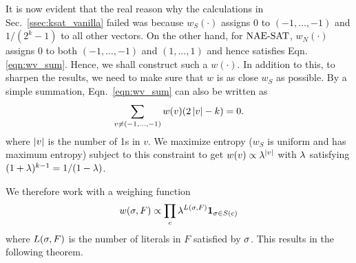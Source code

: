 \documentclass[letterpaper, 10pt, twocolumn, reqno]{amsart}
\begin{document}
It is now evident that the real reason why the calculations in Sec.~\ref{ssec:ksat_vanilla} failed was because $w_S(\cdot)$ assigns 0 to $(-1,\ldots,-1)$
and $1/(2^k-1)$ to all other vectors. On the other hand, for $\textrm{NAE-SAT}$, $w_N(\cdot)$ assigns 0 to both $(-1,\ldots,-1)$ and $(1,\ldots,1)$ and hence satisfies Eqn.~
\eqref{eqn:wv_sum}. Hence, we shall construct such a $w(\cdot)$. In addition to this, to sharpen the results, we need to make sure that $w$ is as close $w_S
$ as possible. By a simple summation, Eqn.~\eqref{eqn:wv_sum} can also be written as
$$
\sum_{v \neq (-1,\ldots,-1)} w(v) (2\left| v \right| - k) = 0.
$$
where $\left| v \right|$ is the number of 1s in $v$. We maximize entropy ($w_S$ is uniform and has maximum entropy) subject to this constraint to get $w(v) \propto \lambda^{\left| v \right|}$ with $\lambda$ satisfying $(1+\lambda)^{k-1} = 1/(1-\lambda)$.

We therefore work with a weighing function
$$
w(\sigma,F) \propto \prod_c \lambda^{L(\sigma,F)} {\bf 1}_{\sigma \in S(c)}
$$
where $L(\sigma,F)$ is the number of literals in $F$ satisfied by $\sigma$. This results in the following theorem.
\end{document}
